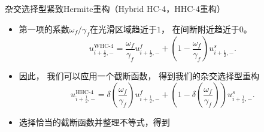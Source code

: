 \documentclass[aspectratio=169]{beamer}
\begin{document}
\begin{frame}{杂交选择型紧致Hermite重构（Hybrid HC-4，HHC-4重构）}
  
  \begin{itemize}[<+->]
    \item 第一项的系数${\omega_{{f}}}/{\gamma_{{f}}}$在光滑区域趋近于$1$，
          在间断附近趋近于$0$。
          \begin{equation*}
            u_{i+\frac{1}{2},-}^{\text{WHC-4}}= \frac{\omega_{{f}}}{\gamma_{{f}}}u_{i+\frac{1}{2},-}^{{f}}+ \left(1 - \frac{\omega_{{f}}}{\gamma_{{f}}}\right) {u}_{i+\frac{1}{2},-}^{{s}}.
          \end{equation*}
          
    \item 因此，
          我们可以应用一个截断函数，
          得到我们的杂交选择型重构
          \begin{equation*}
            \label{eq:1D-HHC4-perpare}
            u_{i+\frac{1}{2},-}^{\text{HHC-4}}= \delta\left(\frac{\omega_{{f}}}{\gamma_{{f}}}\right) u_{i+\frac{1}{2},-}^{{f}}+ \left(1-\delta\left(\frac{\omega_{{f}}}{\gamma_{{f}}}\right) \right) {u}_{i+\frac{1}{2},-}^{{s}}.
          \end{equation*}
          
    \item 选择恰当的截断函数并整理不等式，得到
  \end{itemize}
  
\end{frame}
\end{document}
